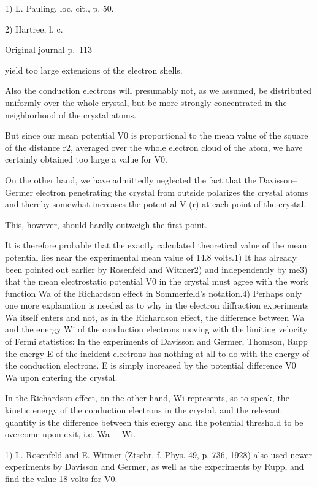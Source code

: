 \documentclass[10pt]{article}
\newcommand{\origpage}[1]{\par\medskip\noindent\hfill{\small\color{notegray}Original journal p.~#1}\hfill\mbox{}\par\smallskip}
\begin{document}
\noindent\footnotesize 1) L. Pauling, loc. cit., p. 50.\par\normalsize
\noindent\footnotesize 2) Hartree, l. c.\par\normalsize
\origpage{113}
yield too large extensions of the electron shells.\par
Also the conduction electrons will presumably not, as we assumed, be distributed uniformly over the whole crystal, but be more strongly concentrated in the neighborhood of the crystal atoms.\par
But since our mean potential V0 is proportional to the mean value of the square of the distance r2, averaged over the whole electron cloud of the atom, we have certainly obtained too large a value for V0.\par
On the other hand, we have admittedly neglected the fact that the Davisson–Germer electron penetrating the crystal from outside polarizes the crystal atoms and thereby somewhat increases the potential V (r) at each point of the crystal.\par
This, however, should hardly outweigh the first point.\par
It is therefore probable that the exactly calculated theoretical value of the mean potential lies near the experimental mean value of 14.8 volts.1) It has already been pointed out earlier by Rosenfeld and Witmer2) and independently by me3) that the mean electrostatic potential V0 in the crystal must agree with the work function Wa of the Richardson effect in Sommerfeld’s notation.4) Perhaps only one more explanation is needed as to why in the electron diffraction experiments Wa itself enters and not, as in the Richardson effect, the difference between Wa and the energy Wi of the conduction electrons moving with the limiting velocity of Fermi statistics: In the experiments of Davisson and Germer, Thomson, Rupp the energy E of the incident electrons has nothing at all to do with the energy of the conduction electrons. E is simply increased by the potential difference V0 = Wa upon entering the crystal.\par
In the Richardson effect, on the other hand, Wi represents, so to speak, the kinetic energy of the conduction electrons in the crystal, and the relevant quantity is the difference between this energy and the potential threshold to be overcome upon exit, i.e. Wa − Wi.\par
\noindent\footnotesize 1) L. Rosenfeld and E. Witmer (Ztschr. f. Phys. 49, p. 736, 1928) also used newer experiments by Davisson and Germer, as well as the experiments by Rupp, and find the value 18 volts for V0.\par\normalsize
\end{document}

